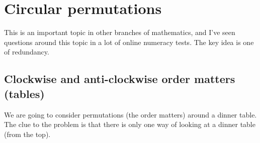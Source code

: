 \documentclass[12pt]{extbook}
\begin{document}





\section{Circular permutations}

This is an important topic in other branches of mathematics, and I've seen questions around this topic in a lot of online numeracy tests.  The key idea is one of redundancy.   

\subsection{Clockwise and anti-clockwise order matters (tables)}

We are going to consider permutations (the order matters) around a dinner table.   The clue to the problem is that there is only one way of looking at a dinner table (from the top).
\end{document}
